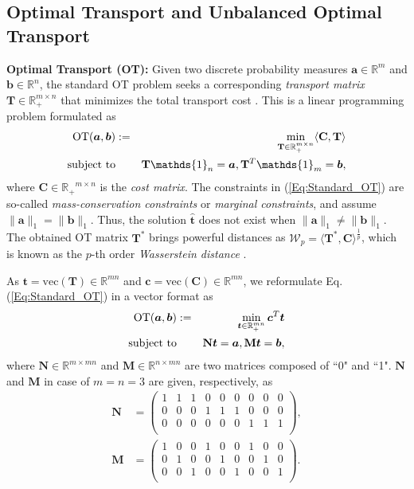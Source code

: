 \documentclass[twoside]{article}
\theoremstyle{plain}
\newcommand{\R}{\mathbb{R}}
\newcommand{\one}{\mathds{1}}
\newcommand{\mat}[1]{\mathbf{#1}}
\renewcommand{\vec}[1]{\bm{#1}}
\begin{document}
\subsection{Optimal Transport and Unbalanced Optimal Transport}
{\bf Optimal Transport (OT):} Given two discrete probability measures $\vec{a}\in \R^{m}$ and $\vec{b} \in \R^{n}$, the standard OT problem seeks a corresponding {\it transport matrix} $\mat{T} \in \R_{+}^{m \times n}$ that minimizes the total transport cost \citep{Kantorovich_1942}. This is a linear programming problem formulated as
\begin{eqnarray}
\label{Eq:Standard_OT}
\operatorname{OT}(\vec{a},\vec{b}) &:=& \min_{ \mat{T} \in \R_{+}^{m \times n}} \langle \mat{C}, \mat{T} \rangle \\
\text{subject\ to}&& \mat{T} \one_n= \vec{a}, \mat{T}^{T}\one_m = \vec{b}, \notag
\end{eqnarray}
where $\mat{C} \in \mathbb{R_{+}}^{m \times n}$ is the {\it cost matrix}. The constraints in (\ref{Eq:Standard_OT}) are so-called {\it mass-conservation constraints} or {\it marginal constraints}, and assume $\|\vec{a}\|_1 = \|\vec{b}\|_1$. Thus, the solution $\hat{\vec{t}}$ does not exist when $\|\vec{a}\|_1 \neq \|\vec{b}\|_1$. The obtained OT matrix $\mat{T}^*$ brings powerful distances as $\mathcal{W}_p = \langle \mat{T}^*,\mat{C} \rangle^{\frac{1}{p}}$, which is known as the $p$-th order {\it Wasserstein distance} \citep{Villani_2008_OTBook}. 


As $\vec{t} = \text{vec}({\mat{T}}) \in \mathbb{R}^{mn}$ and $\vec{c} = \text{vec}({\mat{C}}) \in \mathbb{R}^{mn}$, we reformulate Eq.(\ref{Eq:Standard_OT}) in a vector format as \citep{Chapel_NeurIPS_2021}
\begin{eqnarray}
\label{Eq:Vector_OT}
\operatorname{OT}(\vec{a},\vec{b}) &:=& \min_{\vec{t} \in \R_{+}^{mn}} \vec{c}^T\vec{t} \\
\text{subject\ to}&& \mat{N}\vec{t} = \vec{a}, \mat{M}\vec{t} = \vec{b}, \notag
\end{eqnarray}
where $\mat{N} \in \R^{m \times mn}$ and $\mat{M} \in \R^{n \times mn}$ are two matrices composed of ``0" and ``1". $\mat{N}$ and $\mat{M}$ in case of $m=n=3$ are given, respectively, as
\begin{equation*}
\begin{split}
\mat{N}&=\begin{pmatrix}
1&1&1& 0& 0& 0& 0& 0&0\\
0 & 0& 0&1&1&1& 0& 0&0\\
0 & 0& 0& 0& 0& 0&1&1&1\\
\end{pmatrix},\\
\mat{M}&=\begin{pmatrix}
 1& 0& 0&1& 0& 0&1& 0&0\\
 0&1& 0& 0&1& 0& 0&1&0\\
 0& 0&1& 0& 0&1& 0& 0&1\\
 \end{pmatrix}.
  \end{split}
 \end{equation*}
\end{document}
